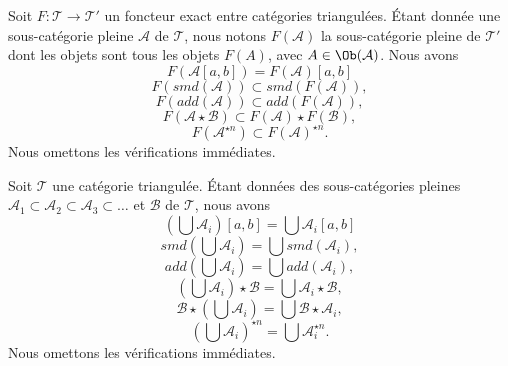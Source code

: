 \begin{remark}
\label{remark-operations-functor}
Soit $F : \mathcal{T} \to \mathcal{T}'$ un foncteur exact entre catégories
triangulées. Étant donnée une sous-catégorie pleine $\mathcal{A}$ de
$\mathcal{T}$, nous notons $F(\mathcal{A})$ la sous-catégorie pleine de
$\mathcal{T}'$ dont les objets sont tous les objets $F(A)$, avec
$A \in \Ob(\mathcal{A})$. Nous avons
$$
F(\mathcal{A}[a, b]) = F(\mathcal{A})[a, b]
$$
$$
F(smd(\mathcal{A})) \subset smd(F(\mathcal{A})),
$$
$$
F(add(\mathcal{A})) \subset add(F(\mathcal{A})),
$$
$$
F(\mathcal{A} \star \mathcal{B}) \subset F(\mathcal{A}) \star F(\mathcal{B}),
$$
$$
F(\mathcal{A}^{\star n}) \subset F(\mathcal{A})^{\star n}.
$$
Nous omettons les vérifications immédiates.
\end{remark}

\begin{remark}
\label{remark-operations-unions}
Soit $\mathcal{T}$ une catégorie triangulée. Étant données des sous-catégories
pleines
$\mathcal{A}_1 \subset \mathcal{A}_2 \subset \mathcal{A}_3 \subset \ldots$
et $\mathcal{B}$ de $\mathcal{T}$, nous avons
$$
\left(\bigcup \mathcal{A}_i\right)[a, b] = \bigcup \mathcal{A}_i[a, b]
$$
$$
smd\left(\bigcup \mathcal{A}_i\right) = \bigcup smd(\mathcal{A}_i),
$$
$$
add\left(\bigcup \mathcal{A}_i\right) = \bigcup add(\mathcal{A}_i),
$$
$$
\left(\bigcup \mathcal{A}_i\right) \star \mathcal{B} =
\bigcup \mathcal{A}_i \star \mathcal{B},
$$
$$
\mathcal{B} \star \left(\bigcup \mathcal{A}_i\right) =
\bigcup \mathcal{B} \star \mathcal{A}_i,
$$
$$
\left(\bigcup \mathcal{A}_i\right)^{\star n} =
\bigcup \mathcal{A}_i^{\star n}.
$$
Nous omettons les vérifications immédiates.
\end{remark}

